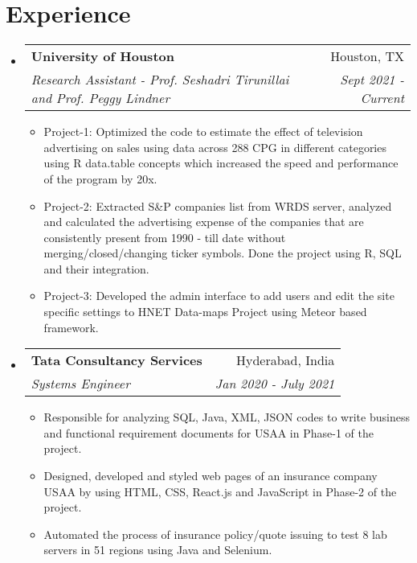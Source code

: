 \documentclass[letterpaper,10.8pt]{article}
\makeatletter
\newcommand{\resumeSubheading}[4]{
  \vspace{-1pt}\item
    \begin{tabular*}{0.97\textwidth}{l@{\extracolsep{\fill}}r}
      \textbf{#1} & #2 \\
      \textit{\small#3} & \textit{\small #4} \\
    \end{tabular*}\vspace{-5pt}
}
\newcommand{\resumeSubHeadingListStart}{\begin{itemize}[leftmargin=*]}
\newcommand{\resumeSubHeadingListEnd}{\end{itemize}}
\newcommand{\resumeItemListStart}{\begin{itemize}}
\newcommand{\resumeItemListEnd}{\end{itemize}\vspace{-5pt}}
\makeatother
\begin{document}
\section{Experience}
  \resumeSubHeadingListStart
    \resumeSubheading
    {University of Houston}{Houston, TX}
    {Research Assistant - Prof. Seshadri Tirunillai and Prof. Peggy Lindner}{Sept 2021 -  Current}
    \resumeItemListStart
        \item{Project-1: Optimized the code to estimate the effect of television advertising on sales using data across 288 CPG in different categories using R data.table concepts which increased the speed and performance of the program by 20x.}
        \item{Project-2: Extracted S&P companies list from WRDS server, analyzed and calculated the advertising expense of the companies that are consistently present from 1990 - till date without merging/closed/changing ticker symbols. Done the project using R, SQL and their integration.}
        \item{Project-3: Developed the admin interface to add users and edit the site specific settings to HNET Data-maps Project using Meteor based framework.}
      \resumeItemListEnd
    \resumeSubheading
    {Tata Consultancy Services}{Hyderabad, India}
    {Systems Engineer}{Jan 2020 - July 2021}
    \resumeItemListStart
        \item{Responsible for analyzing SQL, Java, XML, JSON codes to write business and functional requirement documents for USAA in Phase-1 of the project.}
        \item {Designed, developed and styled web pages of an insurance company USAA by using HTML, CSS, React.js and JavaScript in Phase-2 of the project.}
        \item {Automated the process of insurance policy/quote issuing to test 8 lab servers in 51 regions using Java and Selenium.}
    \resumeItemListEnd
\resumeSubHeadingListEnd

\end{document}
